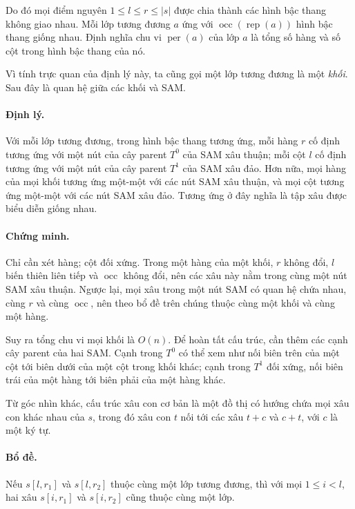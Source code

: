 \documentclass[11pt]{article}
\begin{document}
Do đó mọi điểm nguyên \(1\le l\le r\le |s|\) được chia thành các hình bậc thang
không giao nhau. Mỗi lớp tương đương \(a\) ứng với
\(\operatorname{occ}(\operatorname{rep}(a))\) hình bậc thang giống nhau. Định
nghĩa chu vi \(\operatorname{per}(a)\) của lớp \(a\) là tổng số hàng và số cột
trong hình bậc thang của nó.

Vì tính trực quan của định lý này, ta cũng gọi một lớp tương đương là một
\emph{khối}. Sau đây là quan hệ giữa các khối và SAM.

\paragraph{Định lý.}
Với mỗi lớp tương đương, trong hình bậc thang tương ứng, mỗi hàng \(r\) cố định
tương ứng với một nút của cây parent \(T^0\) của SAM xâu thuận; mỗi cột
\(l\) cố định tương ứng với một nút của cây parent \(T^1\) của SAM xâu đảo.
Hơn nữa, mọi hàng của mọi khối tương ứng một-một với các nút SAM xâu thuận,
và mọi cột tương ứng một-một với các nút SAM xâu đảo. Tương ứng ở đây nghĩa là
tập xâu được biểu diễn giống nhau.

\paragraph{Chứng minh.}
Chỉ cần xét hàng; cột đối xứng. Trong một hàng của một khối, \(r\) không đổi,
\(l\) biến thiên liên tiếp và \(\operatorname{occ}\) không đổi, nên các xâu này
nằm trong cùng một nút SAM xâu thuận. Ngược lại, mọi xâu trong một nút SAM có
quan hệ chứa nhau, cùng \(r\) và cùng \(\operatorname{occ}\), nên theo bổ đề
trên chúng thuộc cùng một khối và cùng một hàng.

Suy ra tổng chu vi mọi khối là \(O(n)\). Để hoàn tất cấu trúc, cần thêm các
cạnh cây parent của hai SAM. Cạnh trong \(T^0\) có thể xem như nối biên trên
của một cột tới biên dưới của một cột trong khối khác; cạnh trong \(T^1\) đối
xứng, nối biên trái của một hàng tới biên phải của một hàng khác.

Từ góc nhìn khác, cấu trúc xâu con cơ bản là một đồ thị có hướng chứa mọi xâu
con khác nhau của \(s\), trong đó xâu con \(t\) nối tới các xâu \(t+c\) và
\(c+t\), với \(c\) là một ký tự.

\paragraph{Bổ đề.}
Nếu \(s[l,r_1]\) và \(s[l,r_2]\) thuộc cùng một lớp tương đương, thì với mọi
\(1\le i<l\), hai xâu \(s[i,r_1]\) và \(s[i,r_2]\) cũng thuộc cùng một lớp.
\end{document}
